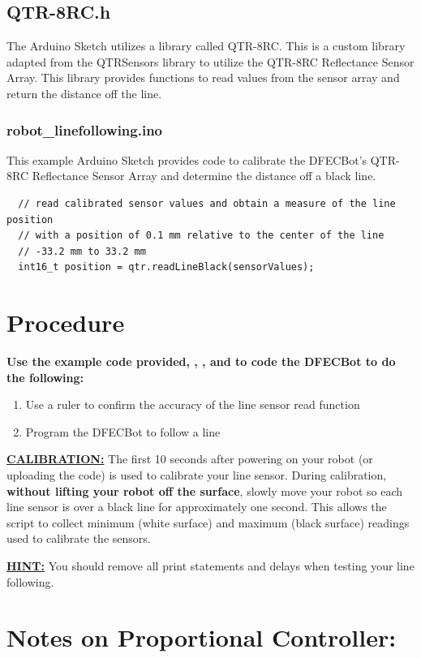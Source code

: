 \documentclass{handout}
\begin{document}
	\subsection{QTR-8RC.h}
	The Arduino Sketch utilizes a library called QTR-8RC. This is a custom library adapted from the QTRSensors library to utilize the QTR-8RC Reflectance Sensor Array. This library provides functions to read values from the sensor array and return the distance off the line.
	
	\subsubsection{robot\_linefollowing.ino}
	This example Arduino Sketch provides code to calibrate the DFECBot's QTR-8RC Reflectance Sensor Array and determine the distance off a black line.
	
	\begin{lstlisting}
  // read calibrated sensor values and obtain a measure of the line position
  // with a position of 0.1 mm relative to the center of the line 
  // -33.2 mm to 33.2 mm
  int16_t position = qtr.readLineBlack(sensorValues);
	\end{lstlisting}
	
	\section{Procedure}
	\textbf{Use the example code provided, , , and  to code the DFECBot to do the following:}
		
	\begin{enumerate}
		\item Use a ruler to confirm the accuracy of the line sensor read function
		\item Program the DFECBot to follow a line
	\end{enumerate}
	{\large \textbf{\underline{CALIBRATION:}}} The first 10 seconds after powering on your robot (or uploading the code) is used to calibrate your line sensor. During calibration, \textbf{without lifting your robot off the surface}, slowly move your robot so each line sensor is over a black line for approximately one second. This allows the script to collect minimum (white surface) and maximum (black surface) readings used to calibrate the sensors.
	
	{\large \textbf{\underline{HINT:}}} You should remove all print statements and delays when testing your line following.
	\section{Notes on Proportional Controller:}
\end{document}
